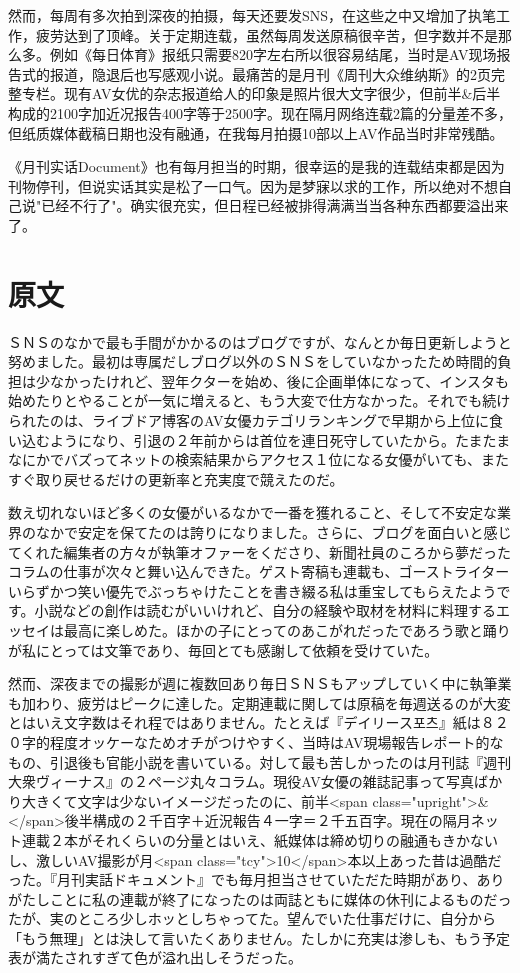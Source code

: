 \documentclass[12pt,UTF8]{ctexbook}
\begin{document}
然而，每周有多次拍到深夜的拍摄，每天还要发SNS，在这些之中又增加了执笔工作，疲劳达到了顶峰。关于定期连载，虽然每周发送原稿很辛苦，但字数并不是那么多。例如《每日体育》报纸只需要820字左右所以很容易结尾，当时是AV现场报告式的报道，隐退后也写感观小说。最痛苦的是月刊《周刊大众维纳斯》的2页完整专栏。现有AV女优的杂志报道给人的印象是照片很大文字很少，但前半\&后半构成的2100字加近况报告400字等于2500字。现在隔月网络连载2篇的分量差不多，但纸质媒体截稿日期也没有融通，在我每月拍摄10部以上AV作品当时非常残酷。

《月刊实话Document》也有每月担当的时期，很幸运的是我的连载结束都是因为刊物停刊，但说实话其实是松了一口气。因为是梦寐以求的工作，所以绝对不想自己说"已经不行了"。确实很充实，但日程已经被排得满满当当各种东西都要溢出来了。

\switchcolumn

\section*{原文}

ＳＮＳのなかで最も手間がかかるのはブログですが、なんとか毎日更新しようと努めました。最初は専属だしブログ以外のＳＮＳをしていなかったため時間的負担は少なかったけれど、翌年クターを始め、後に企画単体になって、インスタも始めたりとやることが一気に増えると、もう大変で仕方なかった。それでも続けられたのは、ライブドア博客のAV女優カテゴリランキングで早期から上位に食い込むようになり、引退の２年前からは首位を連日死守していたから。たまたまなにかでバズってネットの検索結果からアクセス１位になる女優がいても、またすぐ取り戻せるだけの更新率と充実度で競えたのだ。

数え切れないほど多くの女優がいるなかで一番を獲れること、そして不安定な業界のなかで安定を保てたのは誇りになりました。さらに、ブログを面白いと感じてくれた編集者の方々が執筆オファーをくださり、新聞社員のころから夢だったコラムの仕事が次々と舞い込んできた。ゲスト寄稿も連載も、ゴーストライターいらずかつ笑い優先でぶっちゃけたことを書き綴る私は重宝してもらえたようです。小説などの創作は読むがいいけれど、自分の経験や取材を材料に料理するエッセイは最高に楽しめた。ほかの子にとってのあこがれだったであろう歌と踊りが私にとっては文筆であり、毎回とても感謝して依頼を受けていた。

然而、深夜までの撮影が週に複数回あり毎日ＳＮＳもアップしていく中に執筆業も加わり、疲労はピークに達した。定期連載に関しては原稿を毎週送るのが大変とはいえ文字数はそれ程ではありません。たとえば『デイリース포츠』紙は８２０字的程度オッケーなためオチがつけやすく、当時はAV現場報告レポート的なもの、引退後も官能小説を書いている。対して最も苦しかったのは月刊誌『週刊大衆ヴィーナス』の２ページ丸々コラム。現役AV女優の雑誌記事って写真ばかり大きくて文字は少ないイメージだったのに、前半<span class="upright">\&</span>後半構成の２千百字＋近況報告４一字＝２千五百字。現在の隔月ネット連載２本がそれくらいの分量とはいえ、紙媒体は締め切りの融通もきかないし、激しいAV撮影が月<span class="tcy">10</span>本以上あった昔は過酷だった。『月刊実話ドキュメント』でも毎月担当させていただた時期があり、ありがたしことに私の連載が終了になったのは両誌ともに媒体の休刊によるものだったが、実のところ少しホッとしちゃってた。望んでいた仕事だけに、自分から「もう無理」とは決して言いたくありません。たしかに充実は渗しも、もう予定表が満たされすぎて色が溢れ出しそうだった。
\end{document}
